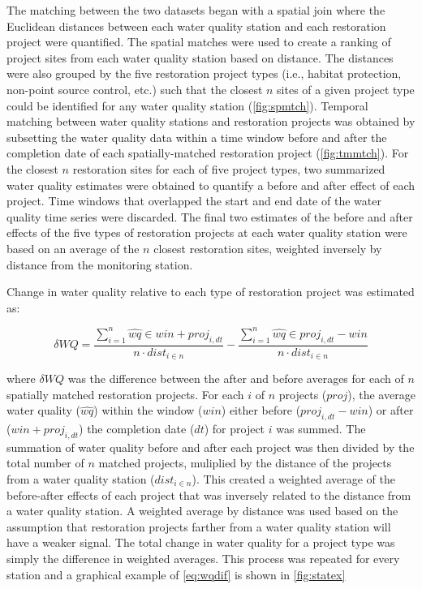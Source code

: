 \documentclass[]{article}
\begin{document}
The matching between the two datasets began with a spatial join where
the Euclidean distances between each water quality station and each
restoration project were quantified. The spatial matches were used to
create a ranking of project sites from each water quality station based
on distance. The distances were also grouped by the five restoration
project types (i.e., habitat protection, non-point source control, etc.)
such that the closest \(n\) sites of a given project type could be
identified for any water quality station (\cref{fig:spmtch}). Temporal
matching between water quality stations and restoration projects was
obtained by subsetting the water quality data within a time window
before and after the completion date of each spatially-matched
restoration project (\cref{fig:tmmtch}). For the closest \(n\)
restoration sites for each of five project types, two summarized water
quality estimates were obtained to quantify a before and after effect of
each project. Time windows that overlapped the start and end date of the
water quality time series were discarded. The final two estimates of the
before and after effects of the five types of restoration projects at
each water quality station were based on an average of the \(n\) closest
restoration sites, weighted inversely by distance from the monitoring
station.

Change in water quality relative to each type of restoration project was
estimated as:

\begin{equation}
\delta WQ = \frac{\sum_{i = 1}^{n} \hat{wq} \in win + proj_{i, dt}}{n \cdot dist_{i \in n}} - \frac{\sum_{i = 1}^{n} \hat{wq} \in proj_{i, dt} - win}{n \cdot dist_{i \in n}}
\label{eq:wqdif}
\end{equation}

where \(\delta WQ\) was the difference between the after and before
averages for each of \(n\) spatially matched restoration projects. For
each \(i\) of \(n\) projects (\(proj\)), the average water quality
(\(\hat{wq}\)) within the window (\(win\)) either before
(\(proj_{i, dt} - win\)) or after (\(win + proj_{i, dt}\)) the
completion date (\(dt\)) for project \(i\) was summed. The summation of
water quality before and after each project was then divided by the
total number of \(n\) matched projects, muliplied by the distance of the
projects from a water quality station (\(dist_{i \in n}\)). This created
a weighted average of the before-after effects of each project that was
inversely related to the distance from a water quality station. A
weighted average by distance was used based on the assumption that
restoration projects farther from a water quality station will have a
weaker signal. The total change in water quality for a project type was
simply the difference in weighted averages. This process was repeated
for every station and a graphical example of \cref{eq:wqdif} is shown in
\cref{fig:statex}
\end{document}

